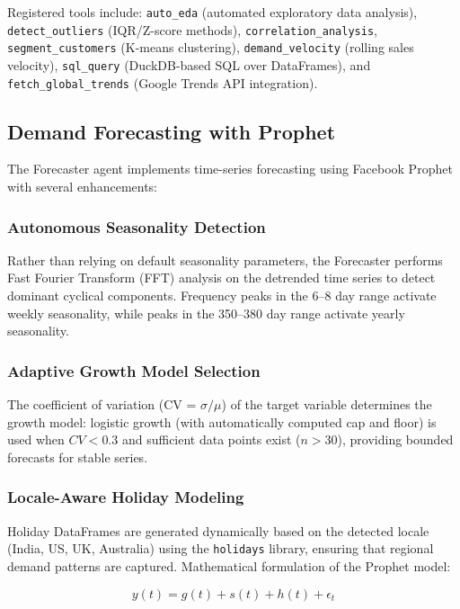 \documentclass[conference]{IEEEtran}
\begin{document}
Registered tools include: \texttt{auto\_eda} (automated exploratory data analysis), \texttt{detect\_outliers} (IQR/Z-score methods), \texttt{correlation\_analysis}, \texttt{segment\_customers} (K-means clustering), \texttt{demand\_velocity} (rolling sales velocity), \texttt{sql\_query} (DuckDB-based SQL over DataFrames), and \texttt{fetch\_global\_trends} (Google Trends API integration).

\subsection{Demand Forecasting with Prophet}

The Forecaster agent implements time-series forecasting using Facebook Prophet with several enhancements:

\subsubsection{Autonomous Seasonality Detection} Rather than relying on default seasonality parameters, the Forecaster performs Fast Fourier Transform (FFT) analysis on the detrended time series to detect dominant cyclical components. Frequency peaks in the 6--8 day range activate weekly seasonality, while peaks in the 350--380 day range activate yearly seasonality.

\subsubsection{Adaptive Growth Model Selection} The coefficient of variation (CV = $\sigma / \mu$) of the target variable determines the growth model: logistic growth (with automatically computed cap and floor) is used when $CV < 0.3$ and sufficient data points exist ($n > 30$), providing bounded forecasts for stable series.

\subsubsection{Locale-Aware Holiday Modeling} Holiday DataFrames are generated dynamically based on the detected locale (India, US, UK, Australia) using the \texttt{holidays} library, ensuring that regional demand patterns are captured. Mathematical formulation of the Prophet model:

\begin{equation}
y(t) = g(t) + s(t) + h(t) + \epsilon_t
\label{eq:prophet}
\end{equation}
\end{document}
